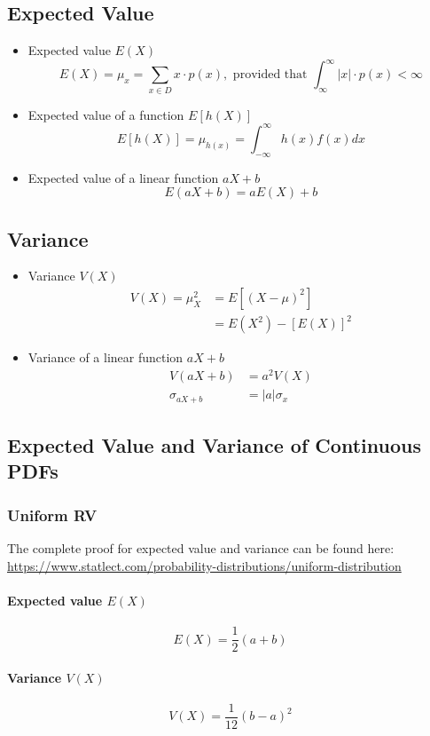 \documentclass[a4paper]{article}
\begin{document}
\subsection{Expected Value}
\begin{itemize}
    \item Expected value $E(X)$
    $$E(X) = \mu_{x} = \sum_{x\in D}x\cdot p(x), \text{ provided that }\int_{\infty}^{\infty}|x|\cdot p(x) < \infty
    $$
    \item Expected value of a function $E[h(X)]$
    $$E[h(X)] = \mu_{h(x)} = \int_{-\infty}^{\infty}h(x)f(x) dx
    $$
    \item Expected value of a linear function $aX + b$
    $$E(aX+b) = aE(X) + b
    $$
\end{itemize}
\subsection{Variance}
\begin{itemize}
    \item Variance $V(X)$
    \begin{align*}
        V(X) = \mu_{X}^2 &= E[(X-\mu)^2]\\
        &= E(X^2)-[E(X)]^2
    \end{align*}
    \item Variance of a linear function $aX + b$
    \begin{align*}
        V(aX + b) &= a^{2}V(X)\\
        \sigma_{aX+b} &= |a|\sigma_{x}
    \end{align*}
\end{itemize}
\subsection{Expected Value and Variance of Continuous PDFs}
\subsubsection{Uniform RV}
The complete proof for expected value and variance can be found here:\\
\href{https://www.statlect.com/probability-distributions/uniform-distribution}{https://www.statlect.com/probability-distributions/uniform-distribution}
\paragraph{Expected value $E(X)$}
$$E(X) = \frac{1}{2}(a+b)$$
\paragraph{Variance $V(X)$}
$$V(X) = \frac{1}{12}(b-a)^2$$
\end{document}
